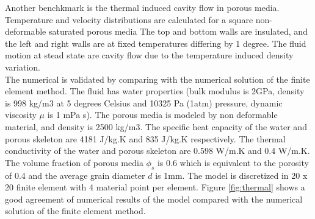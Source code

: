 \documentclass[preprint,12pt]{elsarticle}
\begin{document}
%
%
Another benchkmark is the thermal induced cavity flow in porous media. Temperature and velocity distributions are calculated for a square non-deformable saturated porous media The top and bottom walls are insulated, and the left and right walls are at fixed temperatures differing by 1 degree. The fluid motion at stead state are cavity flow due to the temperature induced density variation. \\
The numerical is validated by comparing with the numerical solution of the finite element method. The fluid has water properties (bulk modulus is 2GPa, density is 998 kg/m3 at 5 degrees Celsius and 10325 Pa (1atm) pressure, dynamic viscosity $\mu$ is 1 mPa s). The porous media is modeled by non deformable material, and density is 2500 kg/m3. The specific heat capacity of the water and porous skeleton are 4181 J/kg.K and 835 J/kg.K respectively. The thermal conductivity of the water and porous skeleton are 0.598 W/m.K and 0.4 W/m.K. The volume fraction of porous media $\phi_s$ is 0.6 which is equivalent to the porosity of 0.4 and the average grain diameter $d$ is 1mm. The model is discretized in 20 x 20 finite element with 4 material point per element. Figure \ref{fig:thermal} shows a good agreement of numerical results of the model compared with the numerical solution of the finite element method. \\
\end{document}
